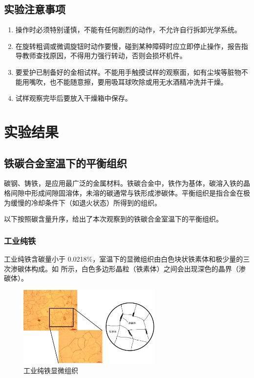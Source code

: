 \documentclass[a4paper,utf8]{article}
\begin{document}
    \subsection{实验注意事项}
        \begin{enumerate}
            \item 操作时必须特别谨慎，不能有任何剧烈的动作，不允许自行拆卸光学系统。
            \item 在旋转粗调或微调旋钮时动作要慢，碰到某种障碍时应立即停止操作，报告指导教师查找原因，不得用力强行转动，否则会损坏机件。
            \item 要爱护已制备好的金相试样。不能用手触摸试样的观察面，如有尘埃等脏物不能用嘴吹，也不能随意擦，要用吸耳球吹除或用无水酒精冲洗并干燥。
            \item 试样观察完毕后要放入干燥箱中保存。
        \end{enumerate}
\section{实验结果}
    \subsection{铁碳合金室温下的平衡组织}
        碳钢、铸铁，是应用最广泛的金属材料。铁碳合金中，铁作为基体，碳溶入铁的晶格间隙中形成间隙固溶体，未溶的碳通常与铁形成渗碳体。平衡组织是指合金在极为缓慢的冷却条件下（如退火状态）所得到的组织。\par
        以下按照碳含量升序，给出了本次观察到的铁碳合金室温下的平衡组织。
        \subsubsection{工业纯铁}
            工业纯铁含碳量小于 0.0218\%，室温下的显微组织由白色块状铁素体和极少量的三次渗碳体构成。如 所示，白色多边形晶粒（铁素体）之间会出现深色的晶界（渗碳体）。
            \begin{figure}[!ht]
                \includegraphics[height=40mm]{result/1.pdf}
                \caption{工业纯铁显微组织\label{fig:1}}
            \end{figure}
\end{document}
